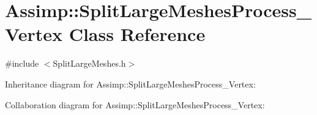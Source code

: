 \hypertarget{class_assimp_1_1_split_large_meshes_process___vertex}{\section{Assimp\+:\+:Split\+Large\+Meshes\+Process\+\_\+\+Vertex Class Reference}
\label{class_assimp_1_1_split_large_meshes_process___vertex}
}


{\ttfamily \#include $<$Split\+Large\+Meshes.\+h$>$}



Inheritance diagram for Assimp\+:\+:Split\+Large\+Meshes\+Process\+\_\+\+Vertex\+:


Collaboration diagram for Assimp\+:\+:Split\+Large\+Meshes\+Process\+\_\+\+Vertex\+:
